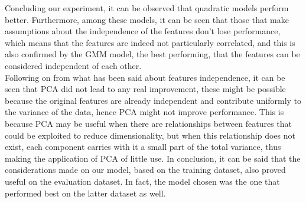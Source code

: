 
Concluding our experiment, it can be observed that quadratic models perform better.
Furthermore, among these models, it can be seen that those that make assumptions about the independence of the features don't lose performance,
which means that the features are indeed not particularly correlated, and this is also confirmed by the GMM model, the best performing,
that the features can be considered independent of each other.\\
Following on from what has been said about features independence, it can be seen that PCA did not lead to any real improvement,
these might be possible because the original features are already independent and contribute uniformly to the variance of the data,
hence PCA might not improve performance.
This is because PCA may be useful when there are relationships between features that could be exploited to reduce dimensionality,
but when this relationship does not exist, each component carries with it a small part of the total variance,
thus making the application of PCA of little use.
In conclusion, it can be said that the considerations made on our model, based on the training dataset, also proved useful on the evaluation dataset.
In fact, the model chosen was the one that performed best on the latter dataset as well.
